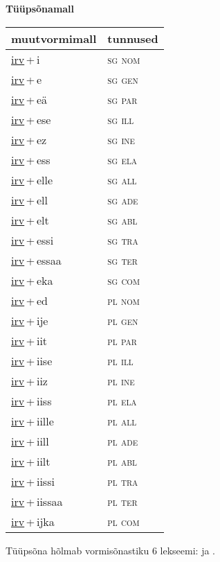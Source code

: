 
\vspace{1.8em}
\begin{minipage}{\textwidth}
\textbf{Tüüpsõnamall \,}\\

\begin{sideways}
\begin{tabular}{l l}
muutvormimall & tunnused \\
\hline
\underline{irv}\,+\,i & \textsc{ sg nom } \\
\underline{irv}\,+\,e & \textsc{ sg gen } \\
\underline{irv}\,+\,eä & \textsc{ sg par } \\
\underline{irv}\,+\,ese & \textsc{ sg ill } \\
\underline{irv}\,+\,ez & \textsc{ sg ine } \\
\underline{irv}\,+\,ess & \textsc{ sg ela } \\
\underline{irv}\,+\,elle & \textsc{ sg all } \\
\underline{irv}\,+\,ell & \textsc{ sg ade } \\
\underline{irv}\,+\,elt & \textsc{ sg abl } \\
\underline{irv}\,+\,essi & \textsc{ sg tra } \\
\underline{irv}\,+\,essaa & \textsc{ sg ter } \\
\underline{irv}\,+\,eka & \textsc{ sg com } \\
\underline{irv}\,+\,ed & \textsc{ pl nom } \\
\underline{irv}\,+\,ije & \textsc{ pl gen } \\
\underline{irv}\,+\,iit & \textsc{ pl par } \\
\underline{irv}\,+\,iise & \textsc{ pl ill } \\
\underline{irv}\,+\,iiz & \textsc{ pl ine } \\
\underline{irv}\,+\,iiss & \textsc{ pl ela } \\
\underline{irv}\,+\,iille & \textsc{ pl all } \\
\underline{irv}\,+\,iill & \textsc{ pl ade } \\
\underline{irv}\,+\,iilt & \textsc{ pl abl } \\
\underline{irv}\,+\,iissi & \textsc{ pl tra } \\
\underline{irv}\,+\,iissaa & \textsc{ pl ter } \\
\underline{irv}\,+\,ijka & \textsc{ pl com } \\
\end{tabular}
\end{sideways}
\label{tab:tüüpsõnamall-irvi}

\end{minipage}

 
\vspace{1em}
\noindent Tüüpsõna hõlmab vormisõnastiku 6 lekseemi:  ja .
